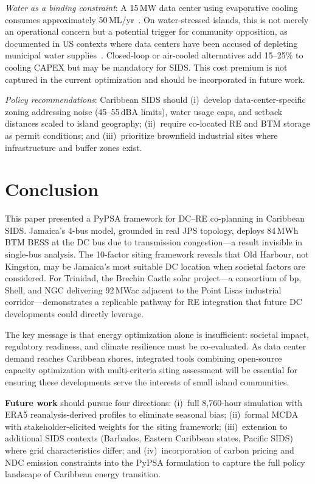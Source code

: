 \documentclass[conference,10pt]{IEEEtran}
\begin{document}
\textit{Water as a binding constraint}: A 15\,MW data center using evaporative cooling consumes approximately 50\,ML/yr~\cite{compass2025}. On water-stressed islands, this is not merely an operational concern but a potential trigger for community opposition, as documented in US contexts where data centers have been accused of depleting municipal water supplies~\cite{dcwatch2025}. Closed-loop or air-cooled alternatives add 15--25\% to cooling CAPEX but may be mandatory for SIDS. This cost premium is not captured in the current optimization and should be incorporated in future work.

\textit{Policy recommendations}: Caribbean SIDS should (i)~develop data-center-specific zoning addressing noise (45--55\,dBA limits), water usage caps, and setback distances scaled to island geography; (ii)~require co-located RE and BTM storage as permit conditions; and (iii)~prioritize brownfield industrial sites where infrastructure and buffer zones exist.

\section{Conclusion}

This paper presented a PyPSA framework for DC--RE co-planning in Caribbean SIDS. Jamaica's 4-bus model, grounded in real JPS topology, deploys 84\,MWh BTM BESS at the DC bus due to transmission congestion---a result invisible in single-bus analysis. The 10-factor siting framework reveals that Old Harbour, not Kingston, may be Jamaica's most suitable DC location when societal factors are considered. For Trinidad, the Brechin Castle solar project---a consortium of bp, Shell, and NGC delivering 92\,MWac adjacent to the Point Lisas industrial corridor---demonstrates a replicable pathway for RE integration that future DC developments could directly leverage.

The key message is that energy optimization alone is insufficient: societal impact, regulatory readiness, and climate resilience must be co-evaluated. As data center demand reaches Caribbean shores, integrated tools combining open-source capacity optimization with multi-criteria siting assessment will be essential for ensuring these developments serve the interests of small island communities.

\textbf{Future work} should pursue four directions: (i)~full 8{,}760-hour simulation with ERA5 reanalysis-derived profiles to eliminate seasonal bias; (ii)~formal MCDA with stakeholder-elicited weights for the siting framework; (iii)~extension to additional SIDS contexts (Barbados, Eastern Caribbean states, Pacific SIDS) where grid characteristics differ; and (iv)~incorporation of carbon pricing and NDC emission constraints into the PyPSA formulation to capture the full policy landscape of Caribbean energy transition.
\end{document}

